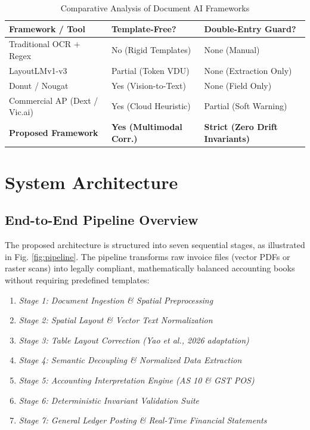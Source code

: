 \documentclass[conference]{IEEEtran}
\begin{document}
\begin{table}[htbp]
\caption{Comparative Analysis of Document AI Frameworks}
\begin{center}
\begin{tabularx}{\columnwidth}{lXX}
\toprule
\textbf{Framework / Tool} & \textbf{Template-Free?} & \textbf{Double-Entry Guard?} \\
\midrule
Traditional OCR + Regex & No (Rigid Templates) & None (Manual) \\
LayoutLMv1-v3 & Partial (Token VDU) & None (Extraction Only) \\
Donut / Nougat & Yes (Vision-to-Text) & None (Field Only) \\
Commercial AP (Dext / Vic.ai) & Yes (Cloud Heuristic) & Partial (Soft Warning) \\
\textbf{Proposed Framework} & \textbf{Yes (Multimodal Corr.)} & \textbf{Strict (Zero Drift Invariants)} \\
\bottomrule
\end{tabularx}
\label{tab:comparison}
\end{center}
\end{table}

\section{System Architecture}
\subsection{End-to-End Pipeline Overview}
The proposed architecture is structured into seven sequential stages, as illustrated in Fig. \ref{fig:pipeline}. The pipeline transforms raw invoice files (vector PDFs or raster scans) into legally compliant, mathematically balanced accounting books without requiring predefined templates:
\begin{enumerate}
    \item \textit{Stage 1: Document Ingestion \& Spatial Preprocessing}
    \item \textit{Stage 2: Spatial Layout \& Vector Text Normalization}
    \item \textit{Stage 3: Table Layout Correction (Yao et al., 2026 adaptation)}
    \item \textit{Stage 4: Semantic Decoupling \& Normalized Data Extraction}
    \item \textit{Stage 5: Accounting Interpretation Engine (AS 10 \& GST POS)}
    \item \textit{Stage 6: Deterministic Invariant Validation Suite}
    \item \textit{Stage 7: General Ledger Posting \& Real-Time Financial Statements}
\end{enumerate}
\end{document}
